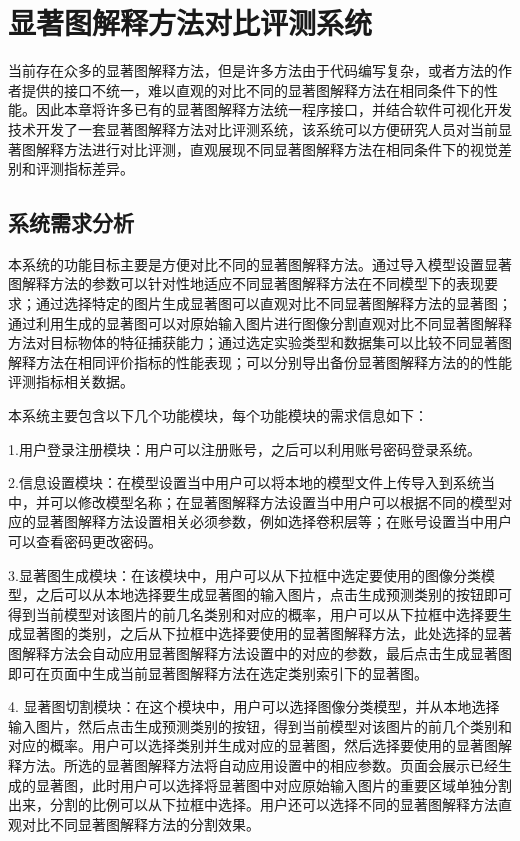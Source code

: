 \chapter{显著图解释方法对比评测系统}
\thispagestyle{others}
\pagestyle{others}
\xiaosi




当前存在众多的显著图解释方法，但是许多方法由于代码编写复杂，或者方法的作者提供的接口不统一，难以直观的对比不同的显著图解释方法在相同条件下的性能。因此本章将许多已有的显著图解释方法统一程序接口，并结合软件可视化开发技术开发了一套显著图解释方法对比评测系统，该系统可以方便研究人员对当前显著图解释方法进行对比评测，直观展现不同显著图解释方法在相同条件下的视觉差别和评测指标差异。

\section{系统需求分析}

本系统的功能目标主要是方便对比不同的显著图解释方法。通过导入模型设置显著图解释方法的参数可以针对性地适应不同显著图解释方法在不同模型下的表现要求；通过选择特定的图片生成显著图可以直观对比不同显著图解释方法的显著图；通过利用生成的显著图可以对原始输入图片进行图像分割直观对比不同显著图解释方法对目标物体的特征捕获能力；通过选定实验类型和数据集可以比较不同显著图解释方法在相同评价指标的性能表现；可以分别导出备份显著图解释方法的的性能评测指标相关数据。

本系统主要包含以下几个功能模块，每个功能模块的需求信息如下： 

 1.用户登录注册模块：用户可以注册账号，之后可以利用账号密码登录系统。
 
 2.信息设置模块：在模型设置当中用户可以将本地的模型文件上传导入到系统当中，并可以修改模型名称；在显著图解释方法设置当中用户可以根据不同的模型对应的显著图解释方法设置相关必须参数，例如选择卷积层等；在账号设置当中用户可以查看密码更改密码。

 3.显著图生成模块：在该模块中，用户可以从下拉框中选定要使用的图像分类模型，之后可以从本地选择要生成显著图的输入图片，点击生成预测类别的按钮即可得到当前模型对该图片的前几名类别和对应的概率，用户可以从下拉框中选择要生成显著图的类别，之后从下拉框中选择要使用的显著图解释方法，此处选择的显著图解释方法会自动应用显著图解释方法设置中的对应的参数，最后点击生成显著图即可在页面中生成当前显著图解释方法在选定类别索引下的显著图。
 
 4. 显著图切割模块：在这个模块中，用户可以选择图像分类模型，并从本地选择输入图片，然后点击生成预测类别的按钮，得到当前模型对该图片的前几个类别和对应的概率。用户可以选择类别并生成对应的显著图，然后选择要使用的显著图解释方法。所选的显著图解释方法将自动应用设置中的相应参数。页面会展示已经生成的显著图，此时用户可以选择将显著图中对应原始输入图片的重要区域单独分割出来，分割的比例可以从下拉框中选择。用户还可以选择不同的显著图解释方法直观对比不同显著图解释方法的分割效果。
 
